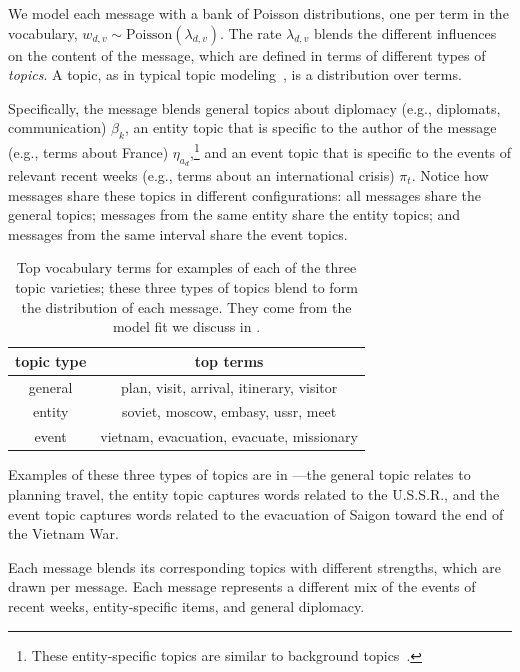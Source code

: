 We model each message with a bank of Poisson distributions, one per
term in the vocabulary, $w_{d,v} \sim \textrm{Poisson}(\lambda_{d,v})$.
The rate $\lambda_{d,v}$ blends the different influences on the
content of the message, which are defined in terms of different types
of \textit{topics}. A topic, as in typical topic modeling~\cite{Blei:2003,canny2004gap,Gopalan:2014b}, is
a distribution over terms.

Specifically, the message blends general topics about diplomacy (e.g.,
diplomats, communication) $\beta_k$, an entity topic that is specific
to the author of the message (e.g., terms about France) $\eta_{a_d}$,\footnote{These entity-specific topics are similar to background topics~\cite{paul2012model}.}
and an event topic that is specific to the events of relevant recent weeks (e.g.,
terms about an international crisis) $\pi_t$. Notice how messages
share these topics in different configurations: all messages share the
general topics; messages from the same entity share the entity topics;
and messages from the same interval share the event topics.

\begin{table}
\centering
\small
\begin{tabular}{cc}
\toprule
topic type & top terms \\
\midrule
general & plan, visit, arrival, itinerary, visitor\\
entity & soviet, moscow, embasy, ussr, meet \\
event & vietnam, evacuation, evacuate, missionary \\
\bottomrule
\end{tabular}
\label{tab:3topics}
\caption{Top vocabulary terms for examples of each of the three topic varieties; these three types of topics blend to form the distribution of each message.  They come from the model fit we discuss in .}
\end{table}

Examples of these three types of topics are in ---the general topic 
relates to planning travel, the entity topic captures words related to the U.S.S.R., and 
the event topic captures words related to the evacuation of Saigon toward the end of the Vietnam War.

Each message blends its corresponding topics with different
strengths, which are drawn per message. Each message represents a
different mix of the events of recent weeks, entity-specific items, and
general diplomacy.

